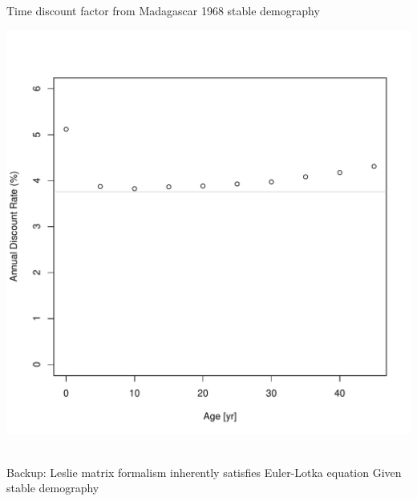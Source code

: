 \documentclass{beamer}
\begin{document}
\begin{frame}{Time discount factor from Madagascar 1968 stable demography}
  \begin{center}
    \includegraphics[width=.7\textwidth]{madagascar_1965_discount_rate.pdf}\
  \end{center}
\end{frame}

\begin{frame}{Backup: Leslie matrix formalism inherently satisfies Euler-Lotka equation}
Given stable demography\\
\end{frame}
\end{document}
